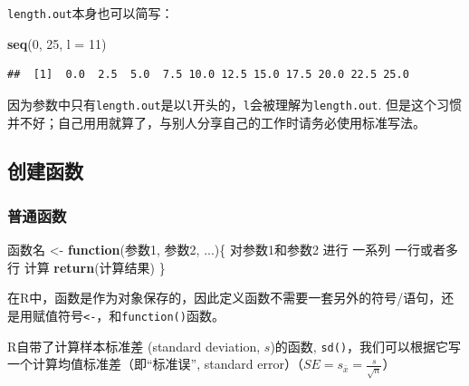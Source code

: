 \documentclass[]{book}
\newenvironment{Shaded}{\begin{snugshade}}{\end{snugshade}}
\newcommand{\ControlFlowTok}[1]{\textcolor[rgb]{0.13,0.29,0.53}{\textbf{#1}}}
\newcommand{\DataTypeTok}[1]{\textcolor[rgb]{0.13,0.29,0.53}{#1}}
\newcommand{\DecValTok}[1]{\textcolor[rgb]{0.00,0.00,0.81}{#1}}
\newcommand{\KeywordTok}[1]{\textcolor[rgb]{0.13,0.29,0.53}{\textbf{#1}}}
\newcommand{\NormalTok}[1]{#1}
\newcommand{\StringTok}[1]{\textcolor[rgb]{0.31,0.60,0.02}{#1}}
\begin{document}
\texttt{length.out}本身也可以简写：

\begin{Shaded}
\begin{Highlighting}[]
\KeywordTok{seq}\NormalTok{(}\DecValTok{0}\NormalTok{, }\DecValTok{25}\NormalTok{, }\DataTypeTok{l =} \DecValTok{11}\NormalTok{)}
\end{Highlighting}
\end{Shaded}

\begin{verbatim}
##  [1]  0.0  2.5  5.0  7.5 10.0 12.5 15.0 17.5 20.0 22.5 25.0
\end{verbatim}

因为参数中只有\texttt{length.out}是以\texttt{l}开头的，\texttt{l}会被理解为\texttt{length.out}. 但是这个习惯并不好；自己用用就算了，与别人分享自己的工作时请务必使用标准写法。

\hypertarget{create-functions}{%
\subsection{创建函数}\label{create-functions}}

\hypertarget{general-functions}{%
\subsubsection{普通函数}\label{general-functions}}

\begin{Shaded}
\begin{Highlighting}[]
\NormalTok{函数名 <-}\StringTok{ }\ControlFlowTok{function}\NormalTok{(参数1, 参数2, ...)\{}
\NormalTok{  对参数1和参数2}
\NormalTok{  进行}
\NormalTok{  一系列}
\NormalTok{  一行或者多行}
\NormalTok{  计算}
  \KeywordTok{return}\NormalTok{(计算结果)}
\NormalTok{\}}
\end{Highlighting}
\end{Shaded}

在R中，函数是作为对象保存的，因此定义函数不需要一套另外的符号/语句，还是用赋值符号\texttt{\textless{}-}，和\texttt{function()}函数。

R自带了计算样本标准差 (standard deviation, \(s\))的函数, \texttt{sd()}，我们可以根据它写一个计算均值标准差（即``标准误'', standard error）（\(SE=s_{\bar{x}}=\frac{s}{\sqrt{n}}\)）
\end{document}
